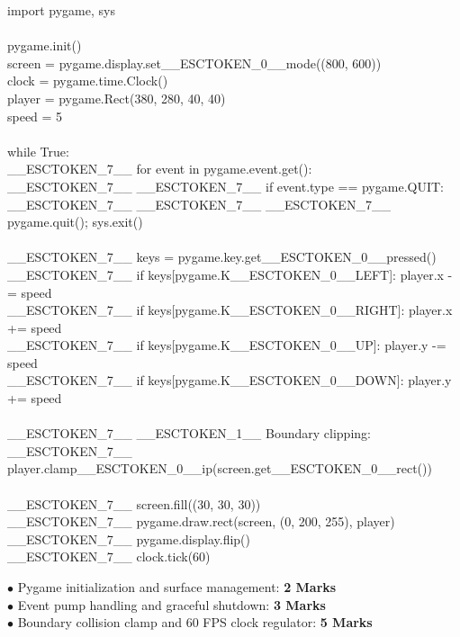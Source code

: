 \begin{solutionbox}
\begin{pycode}
import pygame, sys\\
~\\
pygame.init()\\
screen = pygame.display.set\_\_ESCTOKEN\_0\_\_mode((800, 600))\\
clock = pygame.time.Clock()\\
player = pygame.Rect(380, 280, 40, 40)\\
speed = 5\\
~\\
while True:\\
\_\_ESCTOKEN\_7\_\_ for event in pygame.event.get():\\
\_\_ESCTOKEN\_7\_\_ \_\_ESCTOKEN\_7\_\_ if event.type == pygame.QUIT:\\
\_\_ESCTOKEN\_7\_\_ \_\_ESCTOKEN\_7\_\_ \_\_ESCTOKEN\_7\_\_ pygame.quit(); sys.exit()\\
~\\
\_\_ESCTOKEN\_7\_\_ keys = pygame.key.get\_\_ESCTOKEN\_0\_\_pressed()\\
\_\_ESCTOKEN\_7\_\_ if keys[pygame.K\_\_ESCTOKEN\_0\_\_LEFT]:  player.x -= speed\\
\_\_ESCTOKEN\_7\_\_ if keys[pygame.K\_\_ESCTOKEN\_0\_\_RIGHT]: player.x += speed\\
\_\_ESCTOKEN\_7\_\_ if keys[pygame.K\_\_ESCTOKEN\_0\_\_UP]:    player.y -= speed\\
\_\_ESCTOKEN\_7\_\_ if keys[pygame.K\_\_ESCTOKEN\_0\_\_DOWN]:  player.y += speed\\
~\\
\_\_ESCTOKEN\_7\_\_ \_\_ESCTOKEN\_1\_\_ Boundary clipping:\\
\_\_ESCTOKEN\_7\_\_ player.clamp\_\_ESCTOKEN\_0\_\_ip(screen.get\_\_ESCTOKEN\_0\_\_rect())\\
~\\
\_\_ESCTOKEN\_7\_\_ screen.fill((30, 30, 30))\\
\_\_ESCTOKEN\_7\_\_ pygame.draw.rect(screen, (0, 200, 255), player)\\
\_\_ESCTOKEN\_7\_\_ pygame.display.flip()\\
\_\_ESCTOKEN\_7\_\_ clock.tick(60)
\end{pycode}
\begin{markingrubric}
$\bullet$ Pygame initialization and surface management: \textbf{2 Marks}\\$\bullet$ Event pump handling and graceful shutdown: \textbf{3 Marks}\\$\bullet$ Boundary collision clamp and 60 FPS clock regulator: \textbf{5 Marks}
\end{markingrubric}
\end{solutionbox}

